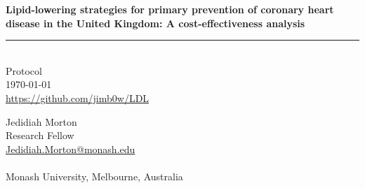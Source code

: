 \documentclass[11pt]{article}
\newcommand{\thedate}{\today}
\begin{document}
\begin{titlepage}
    \begin{flushright}
        \Huge
        \textbf{Lipid-lowering strategies for primary prevention of coronary heart disease 
in the United Kingdom: A cost-effectiveness analysis}
\color{black}
\rule{16cm}{2mm} \\
\Large
\color{black}
Protocol \\
\thedate \\
\color{blue}
\url{https://github.com/jimb0w/LDL} \\
\color{black}
       \vfill
    \end{flushright}
        \Large

\noindent
Jedidiah Morton \\
Research Fellow \\
\color{blue}
\href{mailto:Jedidiah.Morton@Monash.edu}{Jedidiah.Morton@monash.edu} \\ 
\color{black}
\\
Monash University, Melbourne, Australia \\\
\\
\end{titlepage}
\end{document}
